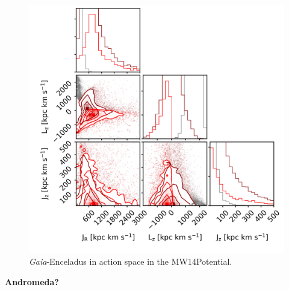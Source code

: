 \begin{figure}[htbp]
    \centering
    \includegraphics[width=1.0\textwidth]{plots/Discussion/Gaia_all_actions_MW14_talk3.png}
    \caption{\textit{Gaia}-Enceladus in action space in the MW14Potential.}
    \label{fig:act_both_merg_best_pot}
\end{figure}
\textbf{Andromeda?}

